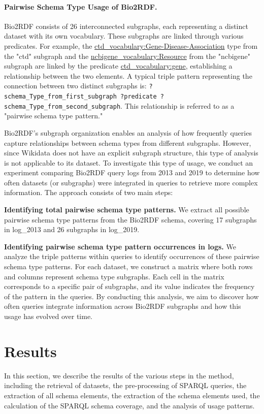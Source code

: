 \documentclass[sw]{iosart2x}
\begin{document}
\paragraph{\textbf{Pairwise Schema Type Usage of Bio2RDF.}}
Bio2RDF consists of 26 interconnected subgraphs, each representing a distinct dataset with its own vocabulary. These subgraphs are linked through various predicates. For example, the \url{ctd_vocabulary:Gene-Disease-Association} type from the "ctd" subgraph and the \url{ncbigene_vocabulary:Resource} from the "ncbigene" subgraph are linked by the predicate \url{ctd_vocabulary:gene}, establishing a relationship between the two elements. A typical triple pattern representing the connection between two distinct subgraphs is: \sloppy \texttt{?schema\_Type\_from\_first\_subgraph ?predicate ?schema\_Type\_from\_second\_subgraph}. This relationship is referred to as a "pairwise schema type pattern."

Bio2RDF’s subgraph organization enables an analysis of how frequently queries capture relationships between schema types from different subgraphs. However, since Wikidata does not have an explicit subgraph structure, this type of analysis is not applicable to its dataset. To investigate this type of usage, we conduct an experiment comparing Bio2RDF query logs from 2013 and 2019 to determine how often datasets (or subgraphs) were integrated in queries to retrieve more complex information. The approach consists of two main steps:

\textbf{Identifying total pairwise schema type patterns.} We extract all possible pairwise schema type patterns from the Bio2RDF schema, covering 17 subgraphs in log\_2013 and 26 subgraphs in log\_2019.


\textbf{Identifying pairwise schema type pattern occurrences in logs.} We analyze the triple patterns within queries to identify occurrences of these pairwise schema type patterns. For each dataset, we construct a matrix where both rows and columns represent schema type subgraphs. Each cell in the matrix corresponds to a specific pair of subgraphs, and its value indicates the frequency of the pattern in the queries.
By conducting this analysis, we aim to discover how often queries integrate information across Bio2RDF subgraphs and how this usage has evolved over time.

\section{Results}\label{s4}
In this section, we describe the results of the various steps in the method, including the retrieval of datasets, the pre-processing of SPARQL queries, the extraction of all schema elements, the extraction of the schema elements used, the calculation of the SPARQL schema coverage, and the analysis of usage patterns.
\end{document}
